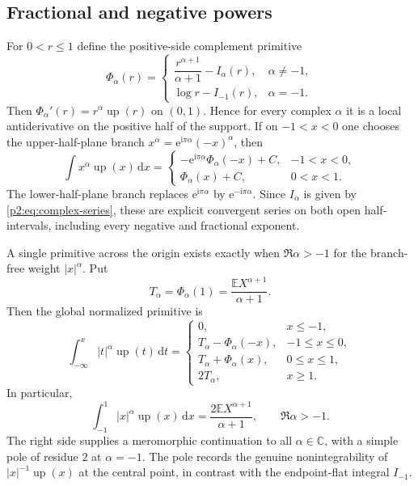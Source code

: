 \documentclass[11pt,oneside]{article}
\theoremstyle{definition}
\theoremstyle{remark}
\newcommand{\Up}{\operatorname{up}}
\newcommand{\E}{\mathbb E}
\newcommand{\C}{\mathbb C}
\newcommand{\dd}{\,\mathrm d}
\newcommand{\e}{\mathrm e}
\newcommand{\ii}{\mathrm i}
\newcommand{\1}{\mathbf 1}
\begin{document}
\subsection{Fractional and negative powers}
For $0<r\le1$ define the positive-side complement primitive
\begin{equation}
 \Phi_\alpha(r)=
 \begin{cases}
 \dfrac{r^{\alpha+1}}{\alpha+1}-I_\alpha(r),&\alpha\ne-1,\\[7pt]
 \log r-I_{-1}(r),&\alpha=-1.
 \end{cases}                                               \label{p2:eq:Phi-alpha}
\end{equation}
Then $\Phi_\alpha'(r)=r^\alpha\Up(r)$ on $(0,1)$.  Hence for every complex
$\alpha$ it is a local antiderivative on the positive half of the support.  If
on $-1<x<0$ one chooses the upper-half-plane branch
$x^\alpha=\e^{\ii\pi\alpha}(-x)^\alpha$, then
\begin{equation}
 \boxed{
 \int x^\alpha\Up(x)\dd x=
 \begin{cases}
 -\e^{\ii\pi\alpha}\Phi_\alpha(-x)+C,&-1<x<0,\\[3pt]
 \Phi_\alpha(x)+C,&0<x<1.
 \end{cases}}                                             \label{p2:eq:up-complex-local}
\end{equation}
The lower-half-plane branch replaces $\e^{\ii\pi\alpha}$ by
$\e^{-\ii\pi\alpha}$.  Since $I_\alpha$ is given by
\eqref{p2:eq:complex-series}, these are explicit convergent series on both open
half-intervals, including every negative and fractional exponent.

A single primitive across the origin exists exactly when $\Re\alpha>-1$ for
the branch-free weight $|x|^\alpha$.  Put
\begin{equation}
 T_\alpha=\Phi_\alpha(1)
 =\frac{\E X^{\alpha+1}}{\alpha+1}.                       \label{p2:eq:T-alpha}
\end{equation}
Then the global normalized primitive is
\begin{equation}
 \boxed{
 \int_{-\infty}^{x}|t|^\alpha\Up(t)\dd t=
 \begin{cases}
 0,&x\le-1,\\
 T_\alpha-\Phi_\alpha(-x),&-1\le x\le0,\\
 T_\alpha+\Phi_\alpha(x),&0\le x\le1,\\
 2T_\alpha,&x\ge1.
 \end{cases}}                                             \label{p2:eq:up-absolute-primitive}
\end{equation}
In particular,
\begin{equation}
 \boxed{
 \int_{-1}^{1}|x|^\alpha\Up(x)\dd x
 =\frac{2\E X^{\alpha+1}}{\alpha+1},\qquad \Re\alpha>-1.} \label{p2:eq:up-fractional-moment}
\end{equation}
The right side supplies a meromorphic continuation to all $\alpha\in\C$, with
a simple pole of residue $2$ at $\alpha=-1$.  The pole records the genuine
nonintegrability of $|x|^{-1}\Up(x)$ at the central point, in contrast with
the endpoint-flat integral $I_{-1}$.
\end{document}

